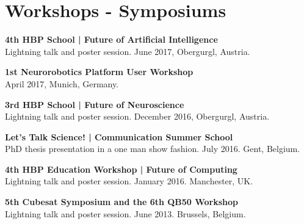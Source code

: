 \documentclass[a4paper]{deedy-resume} %
\begin{document}
\vspace{10pt}

\begin{minipage}[b]{0.53\linewidth}
	
	\section{Workshops -  Symposiums}
	
	\vspace{5pt}
	\textbf{4th HBP School | Future of Artificial Intelligence} \\
	Lightning talk and poster session. June 2017, Obergurgl, Austria.
	
	\vspace{5pt}
	\textbf{1st Neurorobotics Platform User Workshop} \\
	April 2017, Munich, Germany.
	
	\vspace{5pt}
	\textbf{3rd HBP School | Future of Neuroscience} \\
	Lightning talk and poster session. December 2016, Obergurgl, Austria.
	
	\vspace{5pt}
	\textbf{Let's Talk Science! | Communication Summer School} \\
	PhD thesis presentation in a one man show fashion. July 2016. Gent, Belgium.
	\vspace{5pt}
	
	\textbf{4th HBP Education Workshop | Future of Computing} \\
	Lightning talk and poster session. January 2016. Manchester, UK.
	
	\vspace{5pt}
	\textbf{5th Cubesat Symposium and the 6th QB50 Workshop} \\
	Lightning talk and poster session. June 2013. Brussels, Belgium.
	
	\vspace{5pt}
\end{minipage}
\hfill
\end{document}
